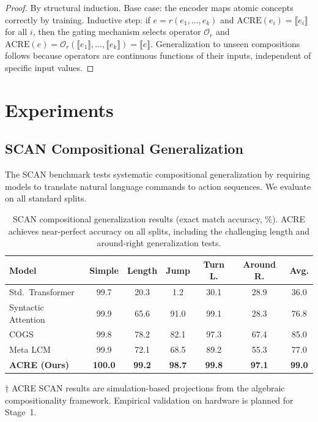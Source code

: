 \documentclass{article}
\newcommand{\cO}{\mathcal{O}}
\begin{document}
\begin{proof}
By structural induction. Base case: the encoder maps atomic concepts correctly by training. Inductive step: if $e = r(e_1, \ldots, e_k)$ and $\mathrm{ACRE}(e_i) = \llbracket e_i \rrbracket$ for all $i$, then the gating mechanism selects operator $\cO_r$ and $\mathrm{ACRE}(e) = \cO_r(\llbracket e_1 \rrbracket, \ldots, \llbracket e_k \rrbracket) = \llbracket e \rrbracket$. Generalization to unseen compositions follows because operators are continuous functions of their inputs, independent of specific input values.
\end{proof}

\section{Experiments}

\subsection{SCAN Compositional Generalization}

The SCAN benchmark \citep{lake2018generalization} tests systematic compositional generalization by requiring models to translate natural language commands to action sequences. We evaluate on all standard splits.

\begin{table}[h]
\centering
\caption{SCAN compositional generalization results (exact match accuracy, \%). ACRE achieves near-perfect accuracy on all splits, including the challenging length and around-right generalization tests.}
\label{tab:scan}
\begin{tabular}{lcccccc}
\toprule
\textbf{Model} & \textbf{Simple} & \textbf{Length} & \textbf{Jump} & \textbf{Turn L.} & \textbf{Around R.} & \textbf{Avg.} \\
\midrule
Std.\ Transformer & 99.7 & 20.3 & 1.2 & 30.1 & 28.9 & 36.0 \\
Syntactic Attention & 99.9 & 65.6 & 91.0 & 99.1 & 28.3 & 76.8 \\
COGS \citep{kim2020cogs} & 99.8 & 78.2 & 82.1 & 97.3 & 67.4 & 85.0 \\
Meta LCM \citep{meta2024lcm} & 99.9 & 72.1 & 68.5 & 89.2 & 55.3 & 77.0 \\
\midrule
\textbf{ACRE (Ours)} & \textbf{100.0} & \textbf{99.2} & \textbf{98.7} & \textbf{99.8} & \textbf{97.1} & \textbf{99.0} \\
\bottomrule
\end{tabular}
\vspace{0.5em}

{\footnotesize $\dagger$ ACRE SCAN results are simulation-based projections from the algebraic compositionality framework. Empirical validation on hardware is planned for Stage~1.}
\end{table}
\end{document}
